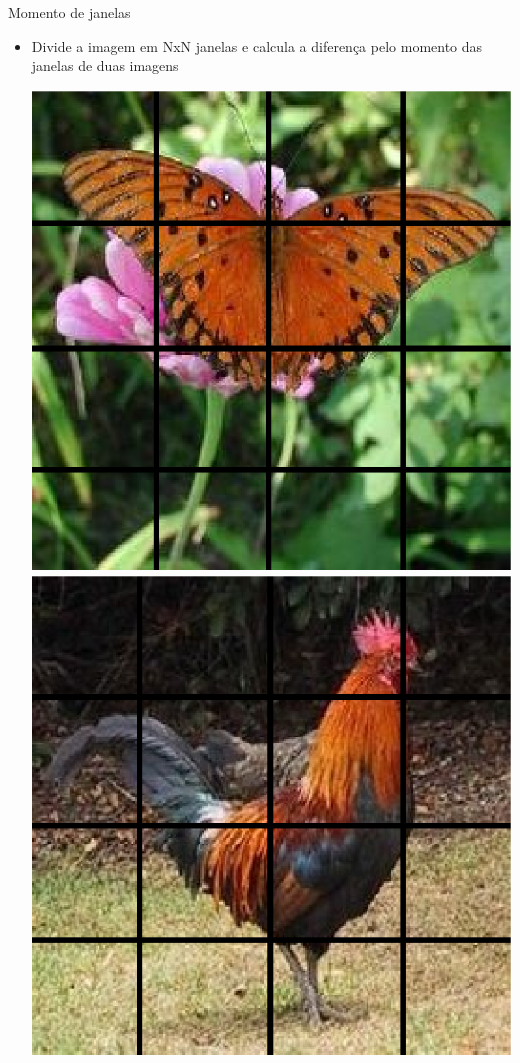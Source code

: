 \documentclass[
    style=paintings,
    paper=screen,
    blackslide,
    nopagebreaks,
    fleqn
]{powerdot}
\begin{document}
\begin{slide}{Momento de janelas}
\begin{itemize}[type=1]
\item <1-> Divide a imagem em NxN janelas e calcula a diferença pelo momento
das janelas de duas imagens
\begin{center}
\includegraphics[width=0.3\slidewidth]{img/janela1}
\hskip 2cm
\includegraphics[width=0.3\slidewidth]{img/janela}
\end{center}
\end{itemize}
\end{slide}
\end{document}
